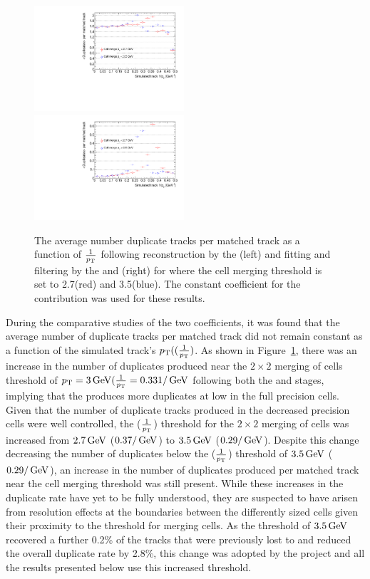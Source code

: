 \begin{figure}[htb]
\centering
\includegraphics[width=0.495\textwidth]{figs/tk-upgrade/results-lowPtTracking/htAvgNumDuplicatesVsInvPtTiltedGeometry_5000.pdf}
\includegraphics[width=0.495\textwidth]{figs/tk-upgrade/results-lowPtTracking/kfAvgNumDuplicatesVsInvPtTiltedGeometry_5000.pdf}
\caption{The average number duplicate tracks per matched track as a function of $\frac{1}{p_{\mathrm{T}}}$ following reconstruction by the \HT (left) and fitting and filtering by the \KF and \DR (right) for where the \HT cell merging \pT threshold is set to 2.7\GeV (red) and 3.5\GeV (blue). 
The constant coefficient for the \MS contribution was used for these \KF results.
}
\label{fig:2GeVfracDups}
\end{figure}

During the comparative studies of the two \MS coefficients, it was found that the average number of duplicate tracks per matched track did not remain constant as a function of the simulated track's $p_{\mathrm{T}} ((\frac{1}{p_{\mathrm{T}}} )$.
As shown in Figure~\ref{fig:2GeVfracDups}, there was an increase in the number of duplicates produced near the $2 \times 2$ merging of \HT cells threshold of  $p_{\mathrm{T}} = 3\,\text{Ge\hspace{-.08em}V} (\frac{1}{p_{\mathrm{T}}} = 0.33 1/\,\text{Ge\hspace{-.08em}V}$ following both the \HT and \DR stages, implying that the \HT produces more duplicates at low \pT in the full precision cells.
Given that the number of duplicate tracks produced in the decreased precision \HT cells were well controlled, the \pT ($\frac{1}{p_{\mathrm{T}}}$) threshold for the $2 \times 2$ merging of \HT cells was increased from $2.7\,\text{Ge\hspace{-.08em}V}$ ($0.37/\,\text{Ge\hspace{-.08em}V}$) to $3.5\,\text{Ge\hspace{-.08em}V}$ ($0.29/\,\text{Ge\hspace{-.08em}V}$).
Despite this change decreasing the number of duplicates below the \pt ($\frac{1}{p_{\mathrm{T}}}$) threshold of $3.5\,\text{Ge\hspace{-.08em}V}$ ($0.29/\,\text{Ge\hspace{-.08em}V}$), an increase in the number of duplicates produced per matched track near the \HT cell merging threshold was still present.
While these increases in the duplicate rate have yet to be fully understood, they are suspected to have arisen from resolution effects at the boundaries between the differently sized \HT cells given their proximity to the \pT threshold for merging \HT cells.
As the \pT threshold of $3.5\,\text{Ge\hspace{-.08em}V}$ recovered a further 0.2\% of the tracks that were previously lost to \MS and reduced the overall duplicate rate by 2.8\%, this change was adopted by the project and all the results presented below use this increased threshold. 

